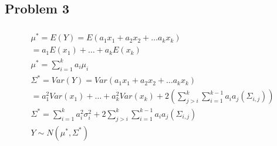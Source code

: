\documentclass{article}
\begin{document}
\begin{flushleft}
	\section*{Problem 3}
\begin{multline*}\\
\mu^*=E(Y)=E(a_1x_1+a_2x_2+\dots a_kx_k)\\
=a_1E(x_1)+\dots +a_kE(x_k)\\
\mu^*=\sum_{i=1}^{k}a_i\mu_i\\
\Sigma^*=Var(Y)=Var(a_1x_1+a_2x_2+\dots a_kx_k)\\
=a_1^2Var(x_1)+\dots +a_k^2Var(x_k)+2\left(\sum_{j>i}^{k}\sum_{i=1}^{k-1}a_ia_j(\Sigma_{i,j})\right)\\
\Sigma^*=\sum_{i=1}^{k}a_i^2\sigma_i^2+2\sum_{j>i}^{k}\sum_{i=1}^{k-1}a_ia_j(\Sigma_{i,j})\\
Y\sim N(\mu^*,\Sigma^*)\\
\end{multline*}


\end{flushleft}
\end{document}
